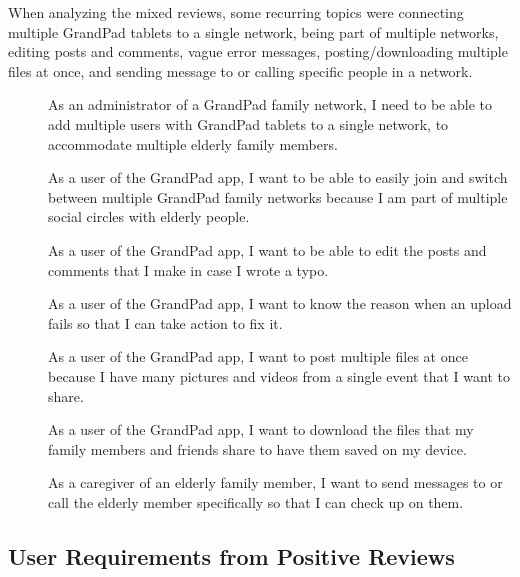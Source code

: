 When analyzing the mixed reviews, some recurring topics were
    connecting multiple GrandPad tablets to a single network,
    being part of multiple networks,
    editing posts and comments,
    vague error messages,
    posting/downloading multiple files at once,
    and sending message to or calling specific people in a network.

\begin{description}
    \item[\textbf{\showusernetcounter}]
        As an administrator of a GrandPad family network, I need to be able to
            add multiple users with GrandPad tablets to a single network, to
            accommodate multiple elderly family members.
    \item[\textbf{\showusernetcounter}]
        As a user of the GrandPad app, I want to be able to easily join and
            switch between multiple GrandPad family networks because I am part
            of multiple social circles with elderly people.
    \item[\textbf{\showuserpostcounter}]
        As a user of the GrandPad app, I want to be able to edit the posts and
            comments that I make in case I wrote a typo.
    \item[\textbf{\showuseruicounter}]
        As a user of the GrandPad app, I want to know the reason when an upload
            fails so that I can take action to fix it.
    \item[\textbf{\showuserpostcounter}]
        As a user of the GrandPad app, I want to post multiple files at once
            because I have many pictures and videos from a single event that I
            want to share.
    \item[\textbf{\showuserpostcounter}]
        As a user of the GrandPad app, I want to download the files that my
            family members and friends share to have them saved on my device.
    \item[\textbf{\showusercallcounter}]
        As a caregiver of an elderly family member, I want to send messages to
            or call the elderly member specifically so that I can check up on
            them.
\end{description}

\subsection*{User Requirements from Positive Reviews}

